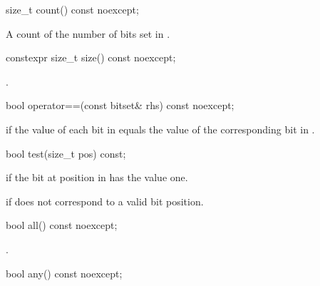 %
\begin{itemdecl}
size_t count() const noexcept;
\end{itemdecl}

\begin{itemdescr}
\pnum
\returns
A count of the number of bits set in
.
\end{itemdescr}

%
\begin{itemdecl}
constexpr size_t size() const noexcept;
\end{itemdecl}

\begin{itemdescr}
\pnum
\returns
{}.
\end{itemdescr}

%
\begin{itemdecl}
bool operator==(const bitset& rhs) const noexcept;
\end{itemdecl}

\begin{itemdescr}
\pnum
\returns
{} if the value of each bit in
equals the value of the corresponding bit in .
\end{itemdescr}

%
\begin{itemdecl}
bool test(size_t pos) const;
\end{itemdecl}

\begin{itemdescr}
\pnum
\returns
{}
if the bit at position 
in
has the value one.

\pnum
\throws
{}%
 if  does not correspond to a valid bit position.
\end{itemdescr}

%
\begin{itemdecl}
bool all() const noexcept;
\end{itemdecl}

\begin{itemdescr}
\pnum
\returns
{}.
\end{itemdescr}

%
%
\begin{itemdecl}
bool any() const noexcept;
\end{itemdecl}

